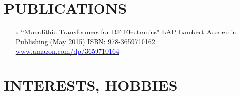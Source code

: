 \documentclass[margin , 10pt]{res} %
\begin{document}
\begin{resume}
		
		\section{ PUBLICATIONS}
		\begin{itemize}
			\item[$\circ$] ``Monolithic Transformers for RF Electronics"\newline
			LAP Lambert Academic Publishing (May 2015) \newline
			ISBN: 978-3659710162\newline
			{\href{http://www.amazon.com/dp/3659710164}{\textcolor{Blue}{ www.amazon.com/dp/3659710164}}}
			
		\end{itemize}
		
		
		
		
		
		
		\section{INTERESTS, HOBBIES}
		

\end{resume}
\end{document}
